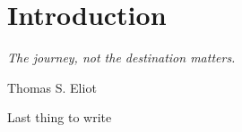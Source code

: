 \chapter*{Introduction}
\epigraph{\emph{The journey, not the destination matters.}}{Thomas S. Eliot}

Last thing to write



